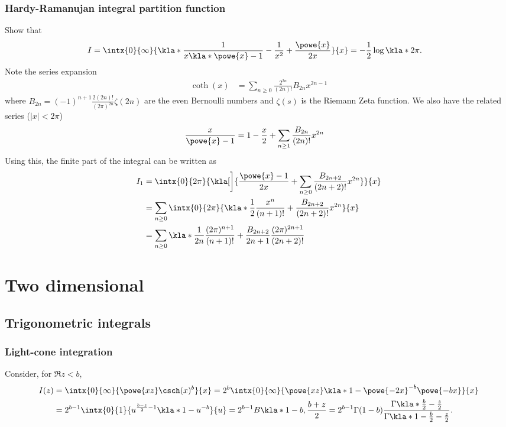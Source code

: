 \documentclass[english, parskip=full]{scrartcl}
\begin{document}
\subsubsection{Hardy-Ramanujan integral partition function}
Show that %
\begin{align}
I &= \intx{0}{\infty}{\kla*{\frac{1}{x\kla*{\powe{x}-1}} - \frac{1}{x^2} + \frac{\powe{x}}{2x}}}{x} = -\frac{1}{2} \log \kla*{2\pi}.
\end{align}
Note the series expansion %
\begin{align}
\coth(x) &= \sum_{n\ge 0} \frac{2^{2n}}{(2n)!} B_{2n} x^{2n-1}
\end{align}
where $B_{2n} = (-1)^{n+1} \frac{2(2n)!}{(2\pi)^{2n}} \zeta(2n)$ are the even Bernoulli numbers and $\zeta(s)$ is the Riemann Zeta function.
We also have the related series ($|x|<2\pi$) %
\begin{align}
\frac{x}{\powe{x}-1} &= 1 - \frac{x}{2} + \sum_{n\ge 1} \frac{B_{2n}}{(2n)!} x^{2n}
\end{align}
Using this, the finite part of the integral can be written as
\begin{align}
I_1 &= \intx{0}{2\pi}{\kla[\bigg]{\frac{\powe{x} - 1}{2x} + \sum_{n\ge 0} \frac{B_{2n+2}}{(2n+2)!} x^{2n}}}{x}\\
&= \sum_{n\ge 0} \intx{0}{2\pi}{\kla*{\frac{1}{2} \frac{x^n}{(n+1)!} + \frac{B_{2n+2}}{(2n+2)!} x^{2n}}}{x}\\
&= \sum_{n\ge 0} \kla*{\frac{1}{2n} \frac{(2\pi)^{n+1}}{(n+1)!} + \frac{B_{2n+2}}{2n+1} \frac{(2\pi)^{2n+1}}{(2n+2)!} }
\end{align}
\section{Two dimensional}
\subsection{Trigonometric integrals}
\subsubsection{Light-cone integration}
Consider, for $\Re z < b$,
\begin{align}
I(z) &= \intx{0}{\infty}{\powe{xz} \csch(x)^b}{x} = 2^b \intx{0}{\infty}{\powe{xz} \kla*{1 - \powe{-2x}}^{-b} \powe{-bx}}{x}\\
&= 2^{b-1} \intx{0}{1}{u^{\frac{b-z}{2} - 1} \kla*{1 - u}^{-b}}{u} = 2^{b-1} B\kla*{1-b, \frac{b+z}{2}} = 2^{b-1} \Gamma(1-b) \frac{\Gamma\kla*{\frac{b}{2} - \frac{z}{2}}}{\Gamma\kla*{1 - \frac{b}{2} - \frac{z}{2}}}.
\end{align}
\end{document}
